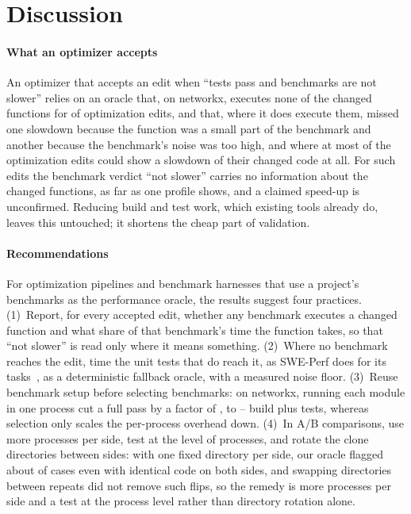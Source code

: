 \section{Discussion}
\label{sec:discussion}

\paragraph*{What an optimizer accepts}
An optimizer that accepts an edit when ``tests pass and benchmarks are not slower'' relies on an oracle that, on networkx, executes none of the changed functions for \BOneAgentUnreached{} of \NxAgentOpt{} optimization edits, and that, where it does execute them, missed one slowdown because the function was a small part of the benchmark and another because the benchmark's noise was too high, and where at most \EditsClearMid{} of the \NxAgentOpt{} optimization edits could show a \PowFactorMid\x{} slowdown of their changed code at all.
For such edits the benchmark verdict ``not slower'' carries no information about the changed functions, as far as one profile shows, and a claimed speed-up is unconfirmed.
Reducing build and test work, which existing tools already do, leaves this untouched; it shortens the cheap part of validation.

\paragraph*{Recommendations}
For optimization pipelines and benchmark harnesses that use a project's benchmarks as the performance oracle, the results suggest four practices.
(1)~Report, for every accepted edit, whether any benchmark executes a changed function and what share of that benchmark's time the function takes, so that ``not slower'' is read only where it means something.
(2)~Where no benchmark reaches the edit, time the unit tests that do reach it, as SWE-Perf does for its tasks~\cite{he2025sweperf}, as a deterministic fallback oracle, with a measured noise floor.
(3)~Reuse benchmark setup before selecting benchmarks: on networkx, running each module in one process cut a full pass by a factor of \EStdOverCached, to \ECachedRatioLo--\ECachedRatioHi\x{} build plus tests, whereas selection only scales the per-process overhead down.
(4)~In A/B comparisons, use more processes per side, test at the level of processes, and rotate the clone directories between sides: with one fixed directory per side, our oracle flagged about \DirAAPct\pct{} of cases even with identical code on both sides, and swapping directories between repeats did not remove such flips, so the remedy is more processes per side and a test at the process level rather than directory rotation alone.

